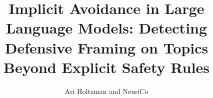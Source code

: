 \documentclass{article}
\title{Implicit Avoidance in Large Language Models: Detecting Defensive Framing on Topics Beyond Explicit Safety Rules}
\author{Ari Holtzman and NeuriCo}
\begin{document}
\maketitle

\begin{abstract}

\end{abstract}










\end{document}
